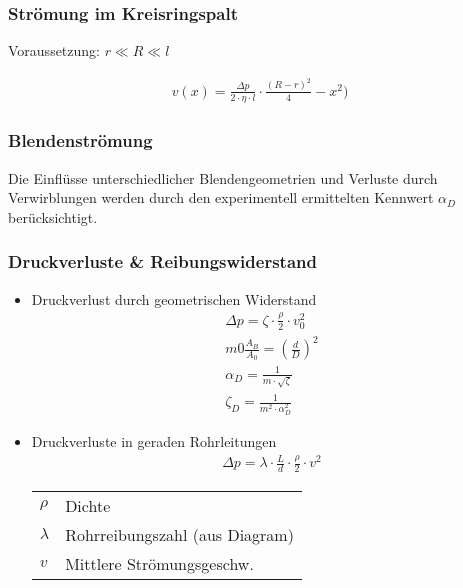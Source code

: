 

\subsubsection{Strömung im Kreisringspalt}

Voraussetzung: $r \ll R \ll l$

\begin{align*}
v(x) = \frac{\Delta p}{2 \cdot \eta \cdot l} \cdot \frac{(R-r)^2}{4} - x^2)
\end{align*}



\subsubsection{Blendenströmung}



Die Einflüsse unterschiedlicher Blendengeometrien und Verluste durch Verwirblungen werden durch den experimentell ermittelten Kennwert $\alpha_D$ berücksichtigt.


\subsubsection{Druckverluste \& Reibungswiderstand}
\begin{itemize}
\item Druckverlust durch geometrischen Widerstand
\begin{align*}
\Delta p = \zeta \cdot \frac{\rho}{2} \cdot v_0^2 \tag{Druckverlust}\\
m 0 \frac{A_B}{A_0} = \left( \frac{d}{D} \right)^2 \tag{Blenden Öffnungsverhältnis} \\
\alpha_D = \frac{1}{m \cdot \sqrt{\zeta}} \tag{Blendenbeiwert} \\
\zeta_D = \frac{1}{m^2 \cdot \alpha_D^2} \tag{Widerstandszahl}
\end{align*}
\item Druckverluste in geraden Rohrleitungen
\begin{align*}
\Delta p = \lambda \cdot \frac{L}{d} \cdot \frac{\rho}{2} \cdot v^2
\end{align*}
\begin{tabular}{ll}
$\rho$ & Dichte \\
$\lambda$ & Rohrreibungszahl (aus Diagram)\\
$v$ & Mittlere Strömungsgeschw.
\end{tabular}
\end{itemize}


